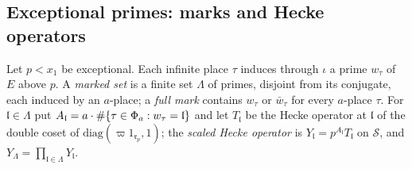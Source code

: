 \subsection{Exceptional primes: marks and Hecke operators}\label{ss:marks}
Let $p<x_1$ be exceptional. Each infinite place $\tau$ induces through $\iota$ a prime $w_\tau$ of $E$ above $p$. A \emph{marked set} is a
finite set $\Lambda$ of primes, disjoint from its conjugate, each induced by an $a$-place; a \emph{full mark} contains $w_\tau$ or $\bar w_\tau$
for every $a$-place $\tau$. For $\mathfrak l\in\Lambda$ put $A_{\mathfrak l}=a\cdot\#\{\tau\in\Phi_a:w_\tau=\mathfrak l\}$ and let $T_{\mathfrak l}$ be the Hecke
operator at $\mathfrak l$ of the double coset of $\mathrm{diag}(\varpi1_{\mathfrak r_p},1)$; the \emph{scaled Hecke operator} is
$Y_{\mathfrak l}=p^{A_{\mathfrak l}}T_{\mathfrak l}$ on $\mathcal S$, and $Y_\Lambda=\prod_{\mathfrak l\in\Lambda}Y_{\mathfrak l}$.

